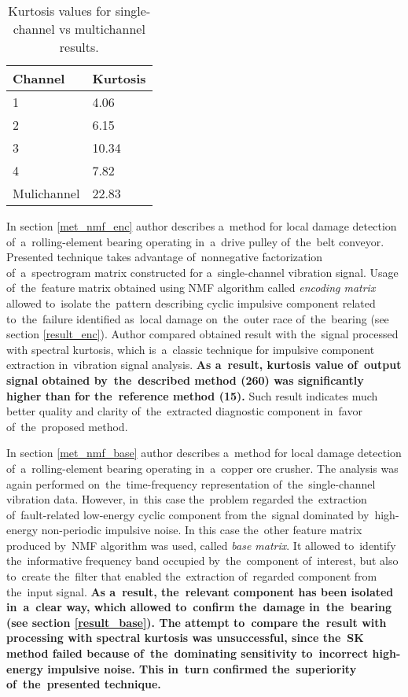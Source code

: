 \begin{table}[ht!]
  \centering
  \caption{Kurtosis values for single-channel vs multichannel results.}
  \begin{tabular}{|l|l|}
  \hline
     \textbf{Channel} & \textbf{Kurtosis} \\ \hline
     1 & 4.06 \\ \hline
     2 & 6.15 \\ \hline
     3 & 10.34 \\ \hline
     4 & 7.82 \\ \hline
     Mulichannel & 22.83 \\ 
  \hline
  \end{tabular}
  \label{tab:wnoski_tab1}
\end{table}


In section \ref{met_nmf_enc} author describes a~method for local damage detection of~a~rolling-element bearing operating in~a~drive pulley of~the~belt conveyor. Presented technique takes advantage of~nonnegative factorization of~a~spectrogram matrix constructed for a~single-channel vibration signal. Usage of~the~feature matrix obtained using NMF algorithm called \emph{encoding matrix} allowed to~isolate the~pattern describing cyclic impulsive component related to~the~failure identified as~local damage on~the~outer race of~the~bearing (see section \ref{result_enc}). Author compared obtained result with the~signal processed with spectral kurtosis, which is~a~classic technique for impulsive component extraction in~vibration signal analysis. \textbf{As a~result, kurtosis value of~output signal obtained by~the~described method (260) was significantly higher than for the~reference method (15).} Such result indicates much better quality and clarity of~the~extracted diagnostic component in~favor of~the~proposed method.

In section \ref{met_nmf_base} author describes a~method for local damage detection of~a~rolling-element bearing operating in~a~copper ore crusher. The analysis was again performed on~the~time-frequency representation of~the~single-channel vibration data. However, in~this case the~problem regarded the~extraction of~fault-related low-energy cyclic component from the~signal dominated by~high-energy non-periodic impulsive noise. In this case the~other feature matrix produced by~NMF algorithm was used, called \emph{base matrix}. It allowed to~identify the~informative frequency band occupied by~the~component of~interest, but also to~create the~filter that enabled the~extraction of~regarded component from the~input signal. \textbf{As a~result, the~relevant component has been isolated in~a~clear way, which allowed to~confirm the~damage in~the~bearing (see section \ref{result_base}). The attempt to~compare the~result with processing with spectral kurtosis was unsuccessful, since the~SK method failed because of~the~dominating sensitivity to~incorrect high-energy impulsive noise. This in~turn confirmed the~superiority of~the~presented technique.}

